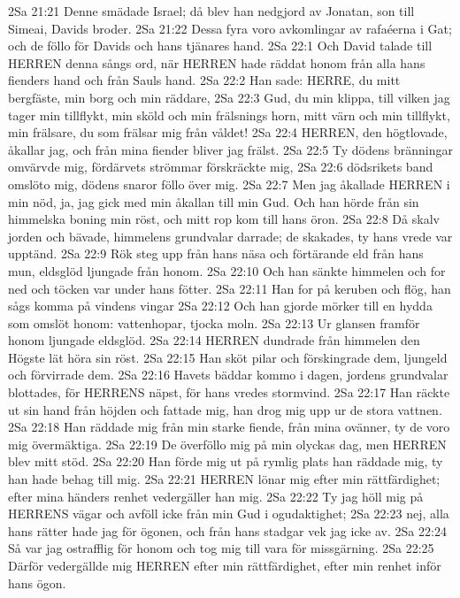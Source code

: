 2Sa 21:21  Denne smädade Israel; då blev han nedgjord av Jonatan, son till Simeai, Davids broder.
2Sa 21:22  Dessa fyra voro avkomlingar av rafaéerna i Gat; och de föllo för Davids och hans tjänares hand.
2Sa 22:1  Och David talade till HERREN denna sångs ord, när HERREN hade räddat honom från alla hans fienders hand och från Sauls hand.
2Sa 22:2  Han sade: HERRE, du mitt bergfäste, min borg och min räddare,
2Sa 22:3  Gud, du min klippa, till vilken jag tager min tillflykt, min sköld och min frälsnings horn, mitt värn och min tillflykt, min frälsare, du som frälsar mig från våldet!
2Sa 22:4  HERREN, den högtlovade, åkallar jag, och från mina fiender bliver jag frälst.
2Sa 22:5  Ty dödens bränningar omvärvde mig, fördärvets strömmar förskräckte mig,
2Sa 22:6  dödsrikets band omslöto mig, dödens snaror föllo över mig.
2Sa 22:7  Men jag åkallade HERREN i min nöd, ja, jag gick med min åkallan till min Gud. Och han hörde från sin himmelska boning min röst, och mitt rop kom till hans öron.
2Sa 22:8  Då skalv jorden och bävade, himmelens grundvalar darrade; de skakades, ty hans vrede var upptänd.
2Sa 22:9  Rök steg upp från hans näsa och förtärande eld från hans mun, eldsglöd ljungade från honom.
2Sa 22:10  Och han sänkte himmelen och for ned och töcken var under hans fötter.
2Sa 22:11  Han for på keruben och flög, han sågs komma på vindens vingar
2Sa 22:12  Och han gjorde mörker till en hydda som omslöt honom: vattenhopar, tjocka moln.
2Sa 22:13  Ur glansen framför honom ljungade eldsglöd.
2Sa 22:14  HERREN dundrade från himmelen den Högste lät höra sin röst.
2Sa 22:15  Han sköt pilar och förskingrade dem, ljungeld och förvirrade dem.
2Sa 22:16  Havets bäddar kommo i dagen, jordens grundvalar blottades, för HERRENS näpst, för hans vredes stormvind.
2Sa 22:17  Han räckte ut sin hand från höjden och fattade mig, han drog mig upp ur de stora vattnen.
2Sa 22:18  Han räddade mig från min starke fiende, från mina ovänner, ty de voro mig övermäktiga.
2Sa 22:19  De överföllo mig på min olyckas dag, men HERREN blev mitt stöd.
2Sa 22:20  Han förde mig ut på rymlig plats han räddade mig, ty han hade behag till mig.
2Sa 22:21  HERREN lönar mig efter min rättfärdighet; efter mina händers renhet vedergäller han mig.
2Sa 22:22  Ty jag höll mig på HERRENS vägar och avföll icke från min Gud i ogudaktighet;
2Sa 22:23  nej, alla hans rätter hade jag för ögonen, och från hans stadgar vek jag icke av.
2Sa 22:24  Så var jag ostrafflig för honom och tog mig till vara för missgärning.
2Sa 22:25  Därför vedergällde mig HERREN efter min rättfärdighet, efter min renhet inför hans ögon.
